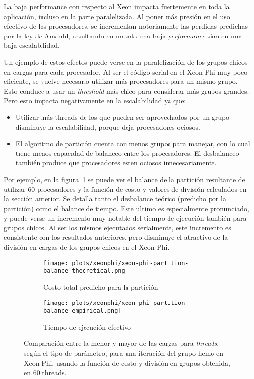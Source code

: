 La baja performance con respecto al Xeon impacta fuertemente en toda
la aplicaci\'on, incluso en la parte paralelizada. Al poner m\'as presi\'on en
el uso efectivo de los procesadores, se incrementan notoriamente las perdidas
predichas por la ley de Amdahl, resultando en no solo una baja \textit{performance}
sino en una baja escalabilidad.

Un ejemplo de estos efectos puede verse en la paralelizaci\'on de los grupos chicos
en cargas para cada procesador. Al ser el c\'odigo serial en el Xeon Phi muy poco
eficiente, se vuelve necesario utilizar m\'as procesadores para un mismo grupo.
Esto conduce a usar un \textit{threshold} m\'as chico para considerar
m\'as grupos grandes. Pero esto impacta negativamente en la escalabilidad ya que:

\begin{itemize}
    \item Utilizar m\'as threads de los que pueden ser aprovechados por un grupo
    disminuye la escalabilidad, porque deja procesadores ociosos.
    \item El algoritmo de partici\'on cuenta con menos grupos para manejar, con
    lo cual tiene menos capacidad de balanceo entre los procesadores. El
    desbalanceo tambi\'en produce que procesadores esten ociosos innecesariamente.
\end{itemize}

Por ejemplo, en la figura~\ref{fig:partition-balance} se puede ver el balance
de la partici\'on resultante de utilizar 60 procesadores y la funci\'on de costo
y valores de divisi\'on calculados en la secci\'on anterior. Se detalla tanto
el desbalance te\'orico (predicho por la partici\'on) como el balance de tiempo.
Este ultimo es especialmente pronunciado, y puede verse un incremento
muy notable del tiempo de ejecuci\'on tambi\'en para grupos chicos. Al ser
los mismos ejecutados serialmente, este incremento es consistente con los
resultados anteriores, pero disminuye el atractivo de la divisi\'on en cargas de
los grupos chicos en el Xeon Phi.

\begin{figure}[htbp]
   \centering
   \begin{subfigure}[b]{\plotwidthtres}
     \texttt{[image: plots/xeonphi/xeon-phi-partition-balance-theoretical.png]}
     \caption{Costo total predicho para la partici\'on}
   \end{subfigure}
   \begin{subfigure}[b]{\plotwidthtres}
       \texttt{[image: plots/xeonphi/xeon-phi-partition-balance-empirical.png]}
     \caption{Tiempo de ejecuci\'on efectivo}
   \end{subfigure}
   \caption{Comparaci\'on entre la menor y mayor de las cargas para \textit{threads},
   seg\'un el tipo de par\'ametro, para una iteraci\'on del grupo hemo en Xeon Phi, usando
   la funci\'on de costo y divisi\'on en grupos obtenida, en 60 threads.}
   \label{fig:partition-balance}
\end{figure}

